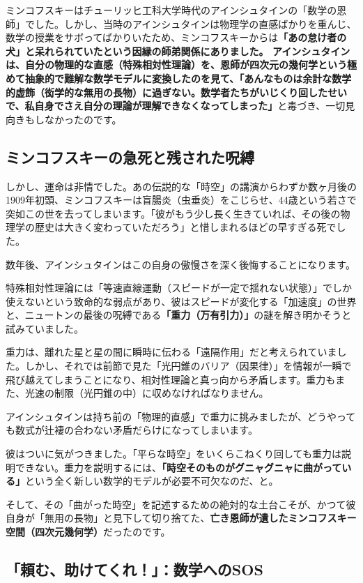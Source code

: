ミンコフスキーはチューリッヒ工科大学時代のアインシュタインの「数学の恩師」でした。しかし、当時のアインシュタインは物理学の直感ばかりを重んじ、数学の授業をサボってばかりいたため、ミンコフスキーからは\textbf{「あの怠け者の犬」と呆れられていたという因縁の師弟関係にありました。 アインシュタインは、自分の物理的な直感（特殊相対性理論）を、恩師が四次元の幾何学という極めて抽象的で難解な数学モデルに変換したのを見て、「あんなものは余計な数学的虚飾（衒学的な無用の長物）に過ぎない。数学者たちがいじくり回したせいで、私自身でさえ自分の理論が理解できなくなってしまった」}と毒づき、一切見向きもしなかったのです。

\subsection{ミンコフスキーの急死と残された呪縛}

しかし、運命は非情でした。あの伝説的な「時空」の講演からわずか数ヶ月後の1909年初頭、ミンコフスキーは盲腸炎（虫垂炎）をこじらせ、44歳という若さで突如この世を去ってしまいます。「彼がもう少し長く生きていれば、その後の物理学の歴史は大きく変わっていただろう」と惜しまれるほどの早すぎる死でした。

数年後、アインシュタインはこの自身の傲慢さを深く後悔することになります。

特殊相対性理論には「等速直線運動（スピードが一定で揺れない状態）」でしか使えないという致命的な弱点があり、彼はスピードが変化する「加速度」の世界と、ニュートンの最後の呪縛である\textbf{「重力（万有引力）」}の謎を解き明かそうと試みていました。

重力は、離れた星と星の間に瞬時に伝わる「遠隔作用」だと考えられていました。しかし、それでは前節で見た「光円錐のバリア（因果律）」を情報が一瞬で飛び越えてしまうことになり、相対性理論と真っ向から矛盾します。重力もまた、光速の制限（光円錐の中）に収めなければなりません。

アインシュタインは持ち前の「物理的直感」で重力に挑みましたが、どうやっても数式が辻褄の合わない矛盾だらけになってしまいます。

彼はついに気がつきました。「平らな時空」をいくらこねくり回しても重力は説明できない。重力を説明するには、\textbf{「時空そのものがグニャグニャに曲がっている」}という全く新しい数学的モデルが必要不可欠なのだ、と。

そして、その「曲がった時空」を記述するための絶対的な土台こそが、かつて彼自身が「無用の長物」と見下して切り捨てた、\textbf{亡き恩師が遺したミンコフスキー空間（四次元幾何学）}だったのです。

\subsection{「頼む、助けてくれ！」：数学へのSOS}

